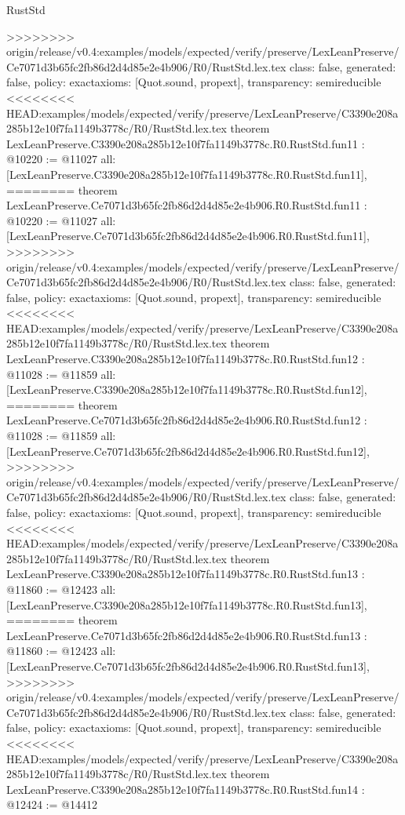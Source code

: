 \begin{lexlean}{RustStd}
\begin{coremodule}
{\begin{coremodule}
{{{{{{{{{{{{{{>>>>>>>> origin/release/v0.4:examples/models/expected/verify/preserve/LexLeanPreserve/Ce7071d3b65fc2fb86d2d4d85e2e4b906/R0/RustStd.lex.tex
  class: false,
  generated: false,
  policy: exact{axioms: [Quot.sound, propext]},
  transparency: semireducible
}
<<<<<<<< HEAD:examples/models/expected/verify/preserve/LexLeanPreserve/C3390e208a285b12e10f7fa1149b3778c/R0/RustStd.lex.tex
theorem LexLeanPreserve.C3390e208a285b12e10f7fa1149b3778c.R0.RustStd.fun11 : @10220 := @11027 {
  all: [LexLeanPreserve.C3390e208a285b12e10f7fa1149b3778c.R0.RustStd.fun11],
========
theorem LexLeanPreserve.Ce7071d3b65fc2fb86d2d4d85e2e4b906.R0.RustStd.fun11 : @10220 := @11027 {
  all: [LexLeanPreserve.Ce7071d3b65fc2fb86d2d4d85e2e4b906.R0.RustStd.fun11],
>>>>>>>> origin/release/v0.4:examples/models/expected/verify/preserve/LexLeanPreserve/Ce7071d3b65fc2fb86d2d4d85e2e4b906/R0/RustStd.lex.tex
  class: false,
  generated: false,
  policy: exact{axioms: [Quot.sound, propext]},
  transparency: semireducible
}
<<<<<<<< HEAD:examples/models/expected/verify/preserve/LexLeanPreserve/C3390e208a285b12e10f7fa1149b3778c/R0/RustStd.lex.tex
theorem LexLeanPreserve.C3390e208a285b12e10f7fa1149b3778c.R0.RustStd.fun12 : @11028 := @11859 {
  all: [LexLeanPreserve.C3390e208a285b12e10f7fa1149b3778c.R0.RustStd.fun12],
========
theorem LexLeanPreserve.Ce7071d3b65fc2fb86d2d4d85e2e4b906.R0.RustStd.fun12 : @11028 := @11859 {
  all: [LexLeanPreserve.Ce7071d3b65fc2fb86d2d4d85e2e4b906.R0.RustStd.fun12],
>>>>>>>> origin/release/v0.4:examples/models/expected/verify/preserve/LexLeanPreserve/Ce7071d3b65fc2fb86d2d4d85e2e4b906/R0/RustStd.lex.tex
  class: false,
  generated: false,
  policy: exact{axioms: [Quot.sound, propext]},
  transparency: semireducible
}
<<<<<<<< HEAD:examples/models/expected/verify/preserve/LexLeanPreserve/C3390e208a285b12e10f7fa1149b3778c/R0/RustStd.lex.tex
theorem LexLeanPreserve.C3390e208a285b12e10f7fa1149b3778c.R0.RustStd.fun13 : @11860 := @12423 {
  all: [LexLeanPreserve.C3390e208a285b12e10f7fa1149b3778c.R0.RustStd.fun13],
========
theorem LexLeanPreserve.Ce7071d3b65fc2fb86d2d4d85e2e4b906.R0.RustStd.fun13 : @11860 := @12423 {
  all: [LexLeanPreserve.Ce7071d3b65fc2fb86d2d4d85e2e4b906.R0.RustStd.fun13],
>>>>>>>> origin/release/v0.4:examples/models/expected/verify/preserve/LexLeanPreserve/Ce7071d3b65fc2fb86d2d4d85e2e4b906/R0/RustStd.lex.tex
  class: false,
  generated: false,
  policy: exact{axioms: [Quot.sound, propext]},
  transparency: semireducible
}
<<<<<<<< HEAD:examples/models/expected/verify/preserve/LexLeanPreserve/C3390e208a285b12e10f7fa1149b3778c/R0/RustStd.lex.tex
theorem LexLeanPreserve.C3390e208a285b12e10f7fa1149b3778c.R0.RustStd.fun14 : @12424 := @14412 {
}}}}}}}}}}}}}}}}}
\end{coremodule}}
\end{coremodule}
\end{lexlean}
